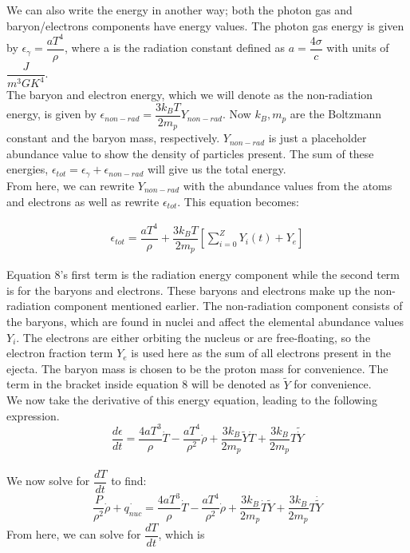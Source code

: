 \documentclass[11pt,a4paper]{article}
\begin{document}
We can also write the energy in another way; both the photon gas and baryon/electrons components have energy values. The photon gas energy is given by $\epsilon_{\gamma} =\dfrac{a T^4}{\rho}$, where a is the radiation constant defined as $a = \dfrac{4 \sigma}{c}$ with units of $\dfrac{J}{m^3 {GK}^4}$.\\

The baryon and electron energy, which we will denote as the non-radiation energy, is given by $\epsilon_{non-rad} = \dfrac{3 k_B T}{2 m_p} Y_{non-rad}$. Now $k_B, m_p$ are the Boltzmann constant and the baryon mass, respectively. $Y_{non-rad}$ is just a placeholder abundance value to show the density of particles present. The sum of these energies, $\epsilon_{tot} = \epsilon_\gamma + \epsilon_{non-rad}$ will give us the total energy. 
\\

From here, we can rewrite $Y_{non-rad}$ with the abundance values from the atoms and electrons as well as rewrite $\epsilon_{tot}$. This equation becomes:  

\begin{align}
	\epsilon_{tot} = \dfrac{a T^4}{\rho} + \dfrac{3 k_B T}{2 m_p} \left[\sum_{i=0}^{Z} Y_i(t) + Y_e \right] 
\end{align}

Equation 8's first term is the radiation energy component while the second term is for the baryons and electrons. These baryons and electrons make up the non-radiation component mentioned earlier. The non-radiation component consists of the baryons, which are found in nuclei and affect the elemental abundance values $Y_i$. The electrons are either orbiting the nucleus or are free-floating, so the electron fraction term $Y_e$ is used here as the sum of all electrons present in the ejecta. The baryon mass is chosen to be the proton mass for convenience. The term in the bracket inside equation 8 will be denoted as $\tilde{Y}$ for convenience.\\
We now take the derivative of this energy equation, leading to the following expression. \\

$$ \dfrac{d \epsilon}{dt} = \dfrac{4a T^3}{\rho}\dot{T} - \dfrac{a T^4}{\rho^2} \dot{\rho} + \dfrac{3 k_B}{2 m_p} \tilde{Y} \dot{T} + \dfrac{3 k_B}{2 m_p} T \tilde{\dot{Y}} $$ \\

We now solve for $\dfrac{dT}{dt}$ to find: 
$$ \dfrac{P}{\rho^2} \dot{\rho} + \dot{q_{nuc}} = \dfrac{4a T^3}{\rho} \dot{T} -  \dfrac{aT^4}{\rho^2} \dot{\rho} + \dfrac{3 k_B}{2 m_p} \dot{T} \tilde{Y} + \dfrac{3 k_B}{2 m_p} T \dot{\tilde{Y}} $$ From here, we can solve for $\dfrac{dT}{dt}$, which is 
\end{document}
